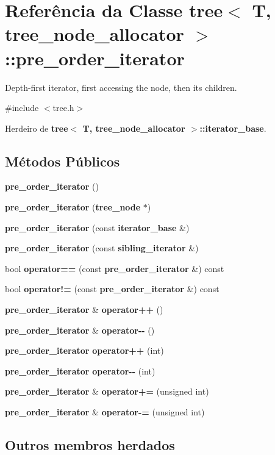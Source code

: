\section{Referência da Classe tree$<$ T, tree\+\_\+node\+\_\+allocator $>$\+:\+:pre\+\_\+order\+\_\+iterator}
\label{classtree_1_1pre__order__iterator}


Depth-\/first iterator, first accessing the node, then its children.  




{\ttfamily \#include $<$tree.\+h$>$}



Herdeiro de {\bf tree$<$ T, tree\+\_\+node\+\_\+allocator $>$\+::iterator\+\_\+base}.

\subsection*{Métodos Públicos}
\begin{DoxyCompactItemize}
\item 
{\bf pre\+\_\+order\+\_\+iterator} ()
\item 
{\bf pre\+\_\+order\+\_\+iterator} ({\bf tree\+\_\+node} $\ast$)
\item 
{\bf pre\+\_\+order\+\_\+iterator} (const {\bf iterator\+\_\+base} \&)
\item 
{\bf pre\+\_\+order\+\_\+iterator} (const {\bf sibling\+\_\+iterator} \&)
\item 
bool {\bf operator==} (const {\bf pre\+\_\+order\+\_\+iterator} \&) const 
\item 
bool {\bf operator!=} (const {\bf pre\+\_\+order\+\_\+iterator} \&) const 
\item 
{\bf pre\+\_\+order\+\_\+iterator} \& {\bf operator++} ()
\item 
{\bf pre\+\_\+order\+\_\+iterator} \& {\bf operator-\/-\/} ()
\item 
{\bf pre\+\_\+order\+\_\+iterator} {\bf operator++} (int)
\item 
{\bf pre\+\_\+order\+\_\+iterator} {\bf operator-\/-\/} (int)
\item 
{\bf pre\+\_\+order\+\_\+iterator} \& {\bf operator+=} (unsigned int)
\item 
{\bf pre\+\_\+order\+\_\+iterator} \& {\bf operator-\/=} (unsigned int)
\end{DoxyCompactItemize}
\subsection*{Outros membros herdados}


